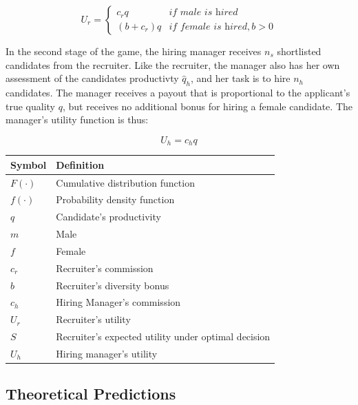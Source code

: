 \documentclass[11pt]{article}
\begin{document}
\[  U_r =
    \begin{cases}
        c_rq     & \textit{if male is hired}          \\
        (b+c_r)q & \textit{if female is hired}, b > 0
    \end{cases}
\]

In the second stage of the game, the hiring manager receives $n_s$ shortlisted candidates from the recruiter. Like the recruiter, the manager also has her own assessment of the candidates productivty $\hat{q}_h$, and her task is to hire $n_h$ candidates. The manager receives a payout that is proportional to the applicant's true quality $q$, but receives no additional bonus for hiring a female candidate. The manager's utility function is thus:

$$U_h = c_hq$$

\begin{center}
    \begin{tabular}{ l l}
        \hline
        Symbol     & Definition                                          \\
        \hline
        $F(\cdot)$ & Cumulative distribution function                    \\
        $f(\cdot)$ & Probability density function                        \\
        $q$        & Candidate's productivity                            \\
        $m$        & Male                                                \\
        $f$        & Female                                              \\
        $c_r$      & Recruiter's commission                              \\
        $b$        & Recruiter's diversity bonus                         \\
        $c_h$      & Hiring Manager's commission                         \\
        $U_r$      & Recruiter's utility                                 \\
        $S$        & Recruiter's expected utility under optimal decision \\
        $U_h$      & Hiring manager's utility                            \\
    \end{tabular}
\end{center}

\subsection{Theoretical Predictions}
\end{document}
